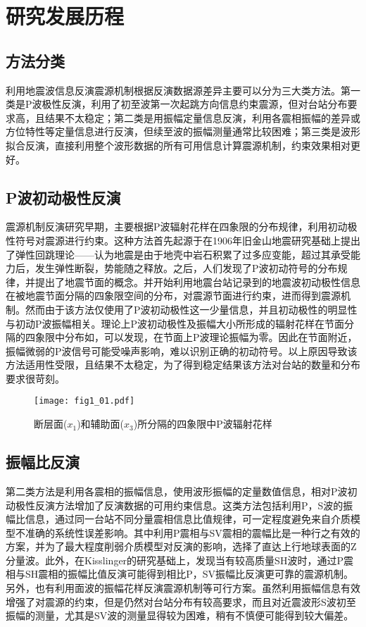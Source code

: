 \section{研究发展历程}

\subsection{方法分类}

利用地震波信息反演震源机制根据反演数据源差异主要可以分为三大类方法。第一类是P波极性反演，利用了初至波第一次起跳方向信息约束震源，但对台站分布要求高，且结果不太稳定；第二类是用振幅定量信息反演，利用各震相振幅的差异或方位特性等定量信息进行反演，但续至波的振幅测量通常比较困难；第三类是波形拟合反演，直接利用整个波形数据的所有可用信息计算震源机制，约束效果相对更好。

\subsection{P波初动极性反演}

震源机制反演研究早期，主要根据P波辐射花样在四象限的分布规律，利用初动极性符号对震源进行约束\citep{Balakina1961}。这种方法首先起源于\citet{Reid1910}在1906年旧金山地震研究\citep{Milne1910}基础上提出了弹性回跳理论——认为地震是由于地壳中岩石积累了过多应变能，超过其承受能力后，发生弹性断裂，势能随之释放。之后，人们发现了P波初动符号的分布规律\citep{Nakano1923}，并提出了地震节面的概念。并开始利用地震台站记录到的地震波初动极性信息在被地震节面分隔的四象限空间的分布，对震源节面进行约束，进而得到震源机制。然而由于该方法仅使用了P波初动极性这一少量信息，并且初动极性的明显性与初动P波振幅相关。理论上P波初动极性及振幅大小所形成的辐射花样在节面分隔的四象限中分布如，可以发现，在节面上P波理论振幅为零。因此在节面附近，振幅微弱的P波信号可能受噪声影响，难以识别正确的初动符号。以上原因导致该方法适用性受限，且结果不太稳定，为了得到稳定结果该方法对台站的数量和分布要求很苛刻。
\begin{figure}
\centering
  \texttt{[image: fig1\_01.pdf]} 
  \caption{断层面($x_1$)和辅助面($x_3$)所分隔的四象限中P波辐射花样\citep{Stein2003}}
  \label{fig1_01}
\end{figure}

\subsection{振幅比反演}

第二类方法是利用各震相的振幅信息，使用波形振幅的定量数值信息，相对P波初动极性反演方法增加了反演数据的可用约束信息。这类方法包括利用P，S波的振幅比信息，通过同一台站不同分量震相信息比值规律，可一定程度避免来自介质模型不准确的系统性误差影响。其中利用P震相与SV震相的震幅比\citep{Kisslinger1982,Kisslinger1980}是一种行之有效的方案，并为了最大程度削弱介质模型对反演的影响，选择了直达上行地球表面的Z分量波。此外，在Kisslinger的研究基础上，\citet{wudaming1989}发现当有较高质量SH波时，通过P震相与SH震相的振幅比值反演可能得到相比P，SV振幅比反演更可靠的震源机制。另外，也有利用面波的振幅花样\citep{Stein2003}反演震源机制等可行方案。虽然利用振幅信息有效增强了对震源的约束，但是仍然对台站分布有较高要求，而且对近震波形S波初至振幅的测量，尤其是SV波的测量显得较为困难\citep{qiyuping2013}，稍有不慎便可能得到较大偏差。

